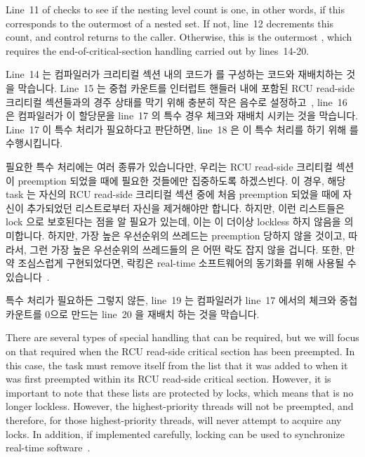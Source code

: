 Line~11 of  checks to see if the nesting level count
is one, in other words, if this corresponds to the outermost
 of a nested set.
If not, line~12 decrements this count, and control returns to the caller.
Otherwise, this is the outermost , which requires
the end-of-critical-section handling carried out by lines~14-20.
\fi

Line~14 는 컴파일러가 크리티컬 섹션 내의 코드가  를
구성하는 코드와 재배치하는 것을 막습니다.
Line~15 는 중첩 카운트를 인터럽트 핸들러 내에 포함된 RCU read-side 크리티컬
섹션들과의 경주 상태를 막기 위해 충분히 작은 음수로
설정하고~\cite{PaulEMcKenney2011RCU3.0trainwreck}, line~16 은 컴파일러가 이
할당문을 line~17 의 특수 경우 체크와 재배치 시키는 것을 막습니다.
Line~17 이 특수 처리가 필요하다고 판단하면, line~18 은 이 특수 처리를 하기 위해
 를 수행시킵니다.

필요한 특수 처리에는 여러 종류가 있습니다만, 우리는 RCU read-side 크리티컬
섹션이 preemption 되었을 때에 필요한 것들에만 집중하도록 하겠스빈다.
이 경우, 해당 task 는 자신의 RCU read-side 크리티컬 섹션 중에 처음 preemption
되었을 때에 자신이 추가되었던 리스트로부터 자신을 제거해야만 합니다.
하지만, 이런 리스트들은 lock 으로 보호된다는 점을 알 필요가 있는데, 이는
 이 더이상 lockless 하지 않음을 의미합니다.
하지만, 가장 높은 우선순위의 쓰레드는 preemption 당하지 않을 것이고, 따라서,
그런 가장 높은 우선순위의 쓰레드들의  은 어떤 락도 잡지
않을 겁니다.
또한, 만약 조심스럽게 구현되었다면, 락킹은 real-time 소프트웨어의 동기화를 위해
사용될 수 있습니다~\cite{BjoernBrandenburgPhD}.

특수 처리가 필요하든 그렇지 않든, line~19 는 컴파일러가 line~17 에서의 체크와
중첩 카운트를 0으로 만드는 line~20 을 재배치 하는 것을 막습니다.
\iffalse

There are several types of special handling that can be required, but
we will focus on that required when the RCU read-side critical section
has been preempted.
In this case, the task must remove itself from the list that it was
added to when it was first preempted within its
RCU read-side critical section.
However, it is important to note that these lists are protected by locks,
which means that  is no longer lockless.
However, the highest-priority threads will not be preempted, and therefore,
for those highest-priority threads,  will never
attempt to acquire any locks.
In addition, if implemented carefully, locking can be used to synchronize
real-time software~\cite{BjoernBrandenburgPhD}.

